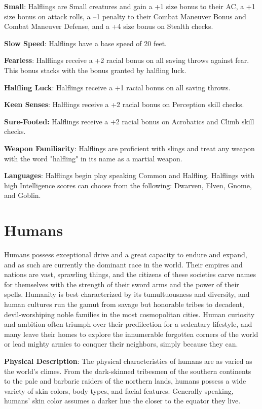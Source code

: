 \textbf{Small}: Halflings are Small creatures and gain a +1 size bonus to their AC, a +1 size bonus on attack rolls, a --1 penalty to their Combat Maneuver Bonus and Combat Maneuver Defense, and a +4 size bonus on Stealth checks.
				
\textbf{Slow Speed}: Halflings have a base speed of 20 feet.
				
\textbf{Fearless}: Halflings receive a +2 racial bonus on all saving throws against fear. This bonus stacks with the bonus granted by halfling luck.
				
\textbf{Halfling Luck}: Halflings receive a +1 racial bonus on all saving throws.
				
\textbf{Keen Senses}: Halflings receive a +2 racial bonus on Perception skill checks.
				
\textbf{Sure-Footed:} Halflings receive a +2 racial bonus on Acrobatics and Climb skill checks.
				
\textbf{Weapon Familiarity}: Halflings are proficient with slings and treat any weapon with the word "halfling" in its name as a martial weapon.
				
\textbf{Languages}: Halflings begin play speaking Common and Halfling. Halflings with high Intelligence scores can choose from the following: Dwarven, Elven, Gnome, and Goblin.
							
\section{Humans}

				
Humans possess exceptional drive and a great capacity to endure and expand, and as such are currently the dominant race in the world. Their empires and nations are vast, sprawling things, and the citizens of these societies carve names for themselves with the strength of their sword arms and the power of their spells. Humanity is best characterized by its tumultuousness and diversity, and human cultures run the gamut from savage but honorable tribes to decadent, devil-worshiping noble families in the most cosmopolitan cities. Human curiosity and ambition often triumph over their predilection for a sedentary lifestyle, and many leave their homes to explore the innumerable forgotten corners of the world or lead mighty armies to conquer their neighbors, simply because they can.
				
\textbf{Physical Description}: The physical characteristics of humans are as varied as the world's climes. From the dark-skinned tribesmen of the southern continents to the pale and barbaric raiders of the northern lands, humans possess a wide variety of skin colors, body types, and facial features. Generally speaking, humans' skin color assumes a darker hue the closer to the equator they live.
				
